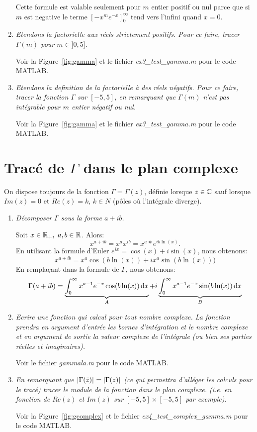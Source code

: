 \documentclass[a4paper,10pt]{article}
\begin{document}
\begin{enumerate}
    Cette formule est valable seulement pour $m$ entier positif ou nul parce que
    si $m$ est negative le terme $\left[-x^m e^{-x}\right]_0^{\infty}$ tend vers
    l'infini quand $x = 0$.

    \item \emph{Etendons la factorielle aux réels strictement positifs. Pour ce faire,
    tracer $\Gamma(m)$ pour $m \in ]0, 5]$.}

    Voir la Figure~\ref{fig:gamma} et le fichier \emph{ex3\_test\_gamma.m} pour le code
    MATLAB.

    \item \emph{Etendons la definition de la factorielle à des réels négatifs. Pour ce
    faire, tracer la fonction $\Gamma$ sur $[-5, 5]$, en remarquant que $\Gamma(m)$
    n'est pas intégrable pour $m$ entier négatif ou nul.}

    Voir la Figure~\ref{fig:gamma} et le fichier \emph{ex3\_test\_gamma.m} pour le code
    MATLAB.
\end{enumerate}

\section{Tracé de $\Gamma$ dans le plan complexe}

On dispose toujours de la fonction $\Gamma = \Gamma(z)$, définie lorsque
$z \in \mathbb{C}$ sauf lorsque $Im(z) = 0$ et $Re(z) = k$, $k \in N$ (pôles où
l'intégrale diverge).

\begin{enumerate}
    \item \emph{Décomposer $\Gamma$ sous la forme $a + ib$.}

    Soit $x \in \mathbb{R}_+,~a, b \in \mathbb{R}$. Alors:
\[
    x^{a+ib} = x^a x^{ib} = x^a * e^{ib\ln(x)}.
\]
    En utilisant la formule d'Euler $e^{ix} = \cos(x) + i\sin(x)$, nous obtenons:
\[
    x^{a+ib} = x^a\cos(b\ln(x)) + i x^a \sin(b\ln(x)))
\]
    En remplaçant dans la formule de $\Gamma$, nous obtenons:
\[
    \Gamma(a+ib) = \underbrace{\int_0^{\infty} x^{a - 1} e^{-x} \cos(b\ln(x)) \,\mathrm{d} x}_{A} +
                   i \underbrace{\int_0^{\infty} x^{a - 1} e^{-x} \sin(b\ln(x)) \,\mathrm{d} x}_{B}
\]
    \item \emph{Ecrire une fonction qui calcul  pour tout nombre complexe. La fonction
    prendra en argument d'entrée les bornes d'intégration et le nombre complexe
    et en argument de sortie la valeur complexe de l'intégrale (ou bien ses parties
    réelles et imaginaires).}

    Voir le fichier \emph{gammala.m} pour le code MATLAB.

    \item \emph{En remarquant que $\lvert\Gamma(\bar{z})\rvert_{} = \lvert\Gamma(z)\rvert_{}$ (ce qui
    permettra d'alléger les calculs pour le tracé) tracer le module de la fonction
    dans le plan complexe. (i.e. en fonction de $Re(z)$ et $Im(z)$ sur
    $[-5, 5] \times [-5, 5]$ par exemple).}

    Voir la Figure~\ref{fig:gcomplex} et le fichier
    \emph{ex4\_test\_complex\_gamma.m} pour le code MATLAB.
\end{enumerate}
\end{document}

